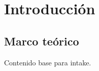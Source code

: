 \documentclass{report}
\begin{document}
\chapter{Introducción}
\section{Marco teórico}
Contenido base para intake.
\end{document}
